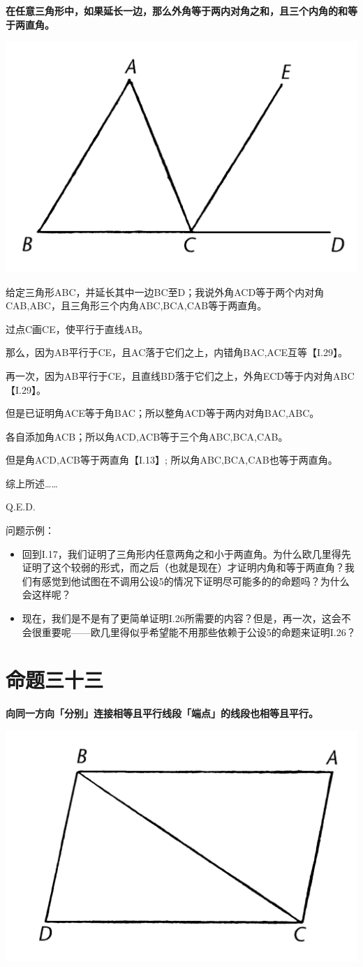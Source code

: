 \documentclass[
]{book}
\providecommand{\tightlist}{%
  \setlength{\itemsep}{0pt}\setlength{\parskip}{0pt}}
\begin{document}
\textbf{在任意三角形中，如果延长一边，那么外角等于两内对角之和，且三个内角的和等于两直角。}

\includegraphics[width=0.3\linewidth]{./image/img519}

给定三角形ABC，并延长其中一边BC至D；我说外角ACD等于两个内对角CAB,ABC，且三角形三个内角ABC,BCA,CAB等于两直角。

过点C画CE，使平行于直线AB。

那么，因为AB平行于CE，且AC落于它们之上，内错角BAC,ACE互等【I.29】。

再一次，因为AB平行于CE，且直线BD落于它们之上，外角ECD等于内对角ABC【I.29】。

但是已证明角ACE等于角BAC；所以整角ACD等于两内对角BAC,ABC。

各自添加角ACB；所以角ACD,ACB等于三个角ABC,BCA,CAB。

但是角ACD,ACB等于两直角【I.13】; 所以角ABC,BCA,CAB也等于两直角。

综上所述\ldots\ldots{}

Q.E.D.

问题示例：

\begin{itemize}
\tightlist
\item
  回到I.17，我们证明了三角形内任意两角之和小于两直角。为什么欧几里得先证明了这个较弱的形式，而之后（也就是现在）才证明内角和等于两直角？我们有感觉到他试图在不调用公设5的情况下证明尽可能多的的命题吗？为什么会这样呢？
\item
  现在，我们是不是有了更简单证明I.26所需要的内容？但是，再一次，这会不会很重要呢------欧几里得似乎希望能不用那些依赖于公设5的命题来证明I.26？
\end{itemize}

\hypertarget{ux547dux9898ux4e09ux5341ux4e09}{%
\section{命题三十三}\label{ux547dux9898ux4e09ux5341ux4e09}}

\textbf{向同一方向「分别」连接相等且平行线段「端点」的线段也相等且平行。}

\includegraphics[width=0.3\linewidth]{./image/img521}
\end{document}
